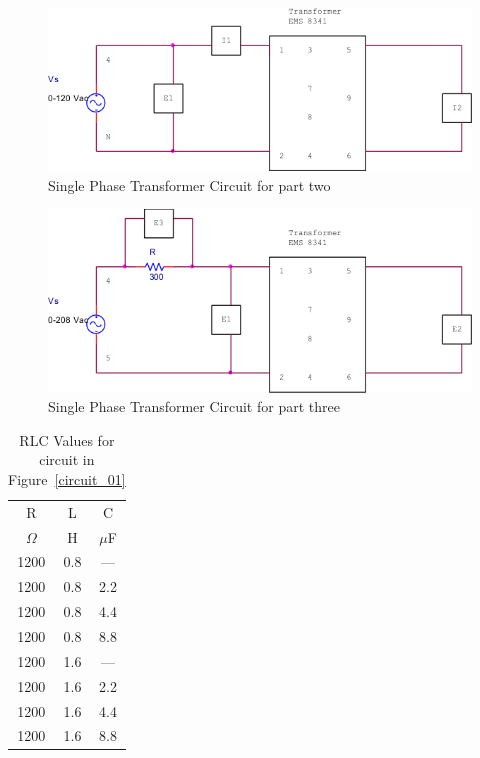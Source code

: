 \documentclass{article}
\begin{document}
\begin{figure}[h]
  \begin{center}
    \includegraphics[width=.8\textwidth]{circuit_02}
    \caption{}
    \caption{Single Phase Transformer Circuit for part two}
    \label{fig:circuit_02}
  \end{center}
\end{figure}

\begin{figure}[h]
  \begin{center}
    \includegraphics[width=.8\textwidth]{circuit_03}
    \caption{Single Phase Transformer Circuit for part three}
    \label{fig:circuit_03}
  \end{center}
\end{figure}

\begin{table}[h]
  \begin{center}
    \begin{tabular}{ccc}
      \hline
      R & L & C \\
      $\Omega$ & H & $\mu$F \\
      \hline
      1200 & 0.8 & --- \\ 1200 & 0.8 & 2.2 \\ 1200 & 0.8 & 4.4 \\
      1200 & 0.8 & 8.8 \\ 1200 & 1.6 & --- \\ 1200 & 1.6 & 2.2 \\
      1200 & 1.6 & 4.4 \\ 1200 & 1.6 & 8.8 \\
      \hline
    \end{tabular}
    \caption{RLC Values for circuit in Figure~\ref{circuit_01}}
    \label{tab:testc_dat}
  \end{center}
\end{table}
\end{document}
